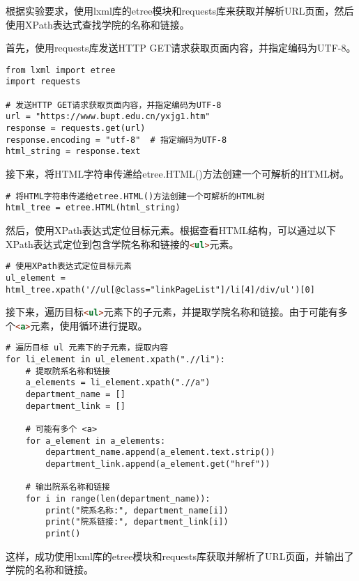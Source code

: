 \documentclass[lang=cn,11pt,a4paper]{elegantpaper}
\begin{document}
根据实验要求，使用lxml库的etree模块和requests库来获取并解析URL页面，然后使用XPath表达式查找学院的名称和链接。

首先，使用requests库发送HTTP GET请求获取页面内容，并指定编码为UTF-8。

\begin{lstlisting}
from lxml import etree
import requests

# 发送HTTP GET请求获取页面内容，并指定编码为UTF-8
url = "https://www.bupt.edu.cn/yxjg1.htm"
response = requests.get(url)
response.encoding = "utf-8"  # 指定编码为UTF-8
html_string = response.text
\end{lstlisting}

接下来，将HTML字符串传递给etree.HTML()方法创建一个可解析的HTML树。

\begin{lstlisting}
# 将HTML字符串传递给etree.HTML()方法创建一个可解析的HTML树
html_tree = etree.HTML(html_string)
\end{lstlisting}

然后，使用XPath表达式定位目标元素。根据查看HTML结构，可以通过以下XPath表达式定位到包含学院名称和链接的\lstinline[language=html]{<ul>}元素。

\begin{lstlisting}
# 使用XPath表达式定位目标元素
ul_element = html_tree.xpath('//ul[@class="linkPageList"]/li[4]/div/ul')[0]
\end{lstlisting}

接下来，遍历目标\lstinline[language=html]{<ul>}元素下的子元素，并提取学院名称和链接。由于可能有多个\lstinline[language=html]{<a>}元素，使用循环进行提取。

\begin{lstlisting}
# 遍历目标 ul 元素下的子元素，提取内容
for li_element in ul_element.xpath(".//li"):
    # 提取院系名称和链接
    a_elements = li_element.xpath(".//a")
    department_name = []
    department_link = []

    # 可能有多个 <a>
    for a_element in a_elements:
        department_name.append(a_element.text.strip())
        department_link.append(a_element.get("href"))

    # 输出院系名称和链接
    for i in range(len(department_name)):
        print("院系名称:", department_name[i])
        print("院系链接:", department_link[i])
        print()
\end{lstlisting}

这样，成功使用lxml库的etree模块和requests库获取并解析了URL页面，并输出了学院的名称和链接。
\end{document}
